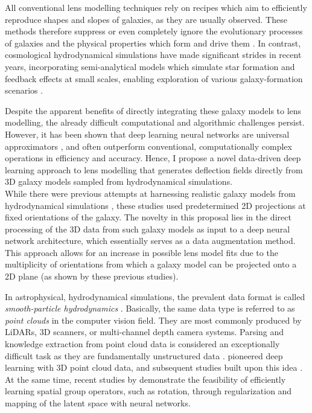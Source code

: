\documentclass[a4paper,10pt]{article}
\begin{document}
All conventional lens modelling techniques rely on recipes which aim
to efficiently reproduce shapes and slopes of galaxies, as they are
usually observed. These methods therefore suppress or even completely
ignore the evolutionary processes of galaxies and the physical
properties which form and drive them \cite[cf.][]{Naab17}. In contrast,
cosmological hydrodynamical simulations have made significant strides
in recent years, incorporating semi-analytical models which simulate
star formation and feedback effects at small scales, enabling
exploration of various galaxy-formation scenarios
\citep[e.g.][]{Pillepich17,Weinberger16,Vogelsberger14}.

Despite the apparent benefits of directly integrating these galaxy
models to lens modelling, the already difficult computational and
algorithmic challenges persist. However, it has been shown that deep
learning neural networks are universal approximators
\citep{Hornik89,Kratsios20}, and often outperform conventional,
computationally complex operations in efficiency and accuracy. Hence,
I propose a novel data-driven deep learning approach to lens modelling
that generates deflection fields directly from 3D galaxy models
sampled from hydrodynamical simulations. \\[0pt]
While there were previous attempts at harnessing realistic galaxy
models from hydrodynamical simulations \citep[see][]{Adam22,Denzel21},
these studies used predetermined 2D projections at fixed orientations
of the galaxy. The novelty in this proposal lies in the direct
processing of the 3D data from such galaxy models as input to a deep
neural network architecture, which essentially serves as a data
augmentation method. This approach allows for an increase in possible
lens model fits due to the multiplicity of orientations from which a
galaxy model can be projected onto a 2D plane (as shown by these
previous studies).

In astrophysical, hydrodynamical simulations, the prevalent data
format is called \emph{smooth-particle hydrodynamics}
\citep{Gingold77,Lucy77,Monaghan92}. Basically, the same data
type is referred to as \emph{point clouds} in the computer vision
field. They are most commonly produced by LiDARs, 3D scanners, or
multi-channel depth camera systems. Parsing and knowledge extraction
from point cloud data is considered an exceptionally difficult task as
they are fundamentally unstructured data
\citep[cf.][]{Vinyals2015,Armeni16,Rufus20,Zhang15,Nuechter07,Rusinkiewicz00}.
\cite{Qi16} pioneered deep learning with 3D point cloud data, and
subsequent studies built upon this idea
\citep[see][]{Qi17,BenShabat17,Klokov17,Kaul21,AbadRocamora22}. \\[0pt]
At the same time, recent studies by \cite{Quessard20,Keurti22}
demonstrate the feasibility of efficiently learning spatial group
operators, such as rotation, through regularization and mapping of the
latent space with neural networks.
\end{document}
